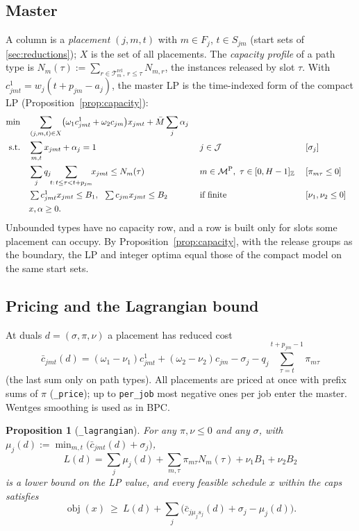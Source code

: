 \documentclass[11pt,a4paper]{article}
\newtheorem{proposition}[theorem]{Proposition}
\theoremstyle{definition}
\theoremstyle{remark}
\newcommand{\J}{\mathcal{J}}
\newcommand{\M}{\mathcal{M}}
\newcommand{\MP}{\M^{\mathrm{P}}}
\newcommand{\Rel}{\mathcal{T}^{\mathrm{rel}}}
\newcommand{\Z}{\mathbb{Z}}
\newcommand{\code}[1]{\texttt{#1}}
\newcommand{\rc}{\bar c}
\begin{document}
\subsection{Master}
A column is a \emph{placement} $(j,m,t)$ with $m\in F_j$, $t\in S_{jm}$ (start
sets of \cref{sec:reductions}); $X$ is the set of all placements. The
\emph{capacity profile} of a path type is
$N_m(\tau):=\sum_{r\in\Rel_m,\,r\le\tau}N_{m,r}$, the instances released by
slot $\tau$. With $c^1_{jmt}=w_j(t+p_{jm}-a_j)$, the master LP is the
time-indexed form of the compact LP (Proposition~\ref{prop:capacity}):
\begin{alignat}{3}
\min\quad&\sum_{(j,m,t)\in X}\bigl(\omega_1c^1_{jmt}+\omega_2c_{jm}\bigr)x_{jmt}+\bar M\sum_j\alpha_j\notag\\
\text{s.t.}\quad&\sum_{m,t}x_{jmt}+\alpha_j=1 &\;& j\in\J &\;&[\sigma_j]\label{eq:lp-cover}\\
&\sum_{j}q_j\!\!\sum_{t:\,t\le\tau<t+p_{jm}}\!\!x_{jmt}\le N_m(\tau) && m\in\MP,\ \tau\in[0,H-1]_\Z&&[\pi_{m\tau}\le0]\label{eq:lp-cap}\\
&\textstyle\sum c^1_{jmt}x_{jmt}\le B_1,\ \ \sum c_{jm}x_{jmt}\le B_2 && \text{if finite}&&[\nu_1,\nu_2\le0]\notag\\
&x,\alpha\ge0.\notag
\end{alignat}
Unbounded types have no capacity row, and a row is built only for slots some
placement can occupy. By Proposition~\ref{prop:capacity}, with the release groups as the
boundary, the LP and integer optima equal those of the compact model on the
same start sets.

\subsection{Pricing and the Lagrangian bound}
At duals $d=(\sigma,\pi,\nu)$ a placement has reduced cost
\begin{equation}\label{eq:lp-rc}
\rc_{jmt}(d)=(\omega_1-\nu_1)c^1_{jmt}+(\omega_2-\nu_2)c_{jm}-\sigma_j-q_j\sum_{\tau=t}^{t+p_{jm}-1}\pi_{m\tau}
\end{equation}
(the last sum only on path types). All placements are priced at once with
prefix sums of $\pi$ (\code{\_price}); up to \code{per\_job} most negative ones
per job enter the master. Wentges smoothing is used as in BPC.

\begin{proposition}[\code{\_lagrangian}]\label{prop:lp-lagr}
For any $\pi,\nu\le0$ and any $\sigma$, with
$\mu_j(d):=\min_{m,t}\bigl(\rc_{jmt}(d)+\sigma_j\bigr)$,
\[
L(d)=\sum_j\mu_j(d)+\sum_{m,\tau}\pi_{m\tau}N_m(\tau)+\nu_1B_1+\nu_2B_2
\]
is a lower bound on the LP value, and every feasible schedule $x$ within the
caps satisfies
\begin{equation}\label{eq:lp-cert}
\operatorname{obj}(x)\ \ge\ L(d)+\sum_j\bigl(\rc_{j\mu_js_j}(d)+\sigma_j-\mu_j(d)\bigr).
\end{equation}
\end{proposition}
\end{document}
